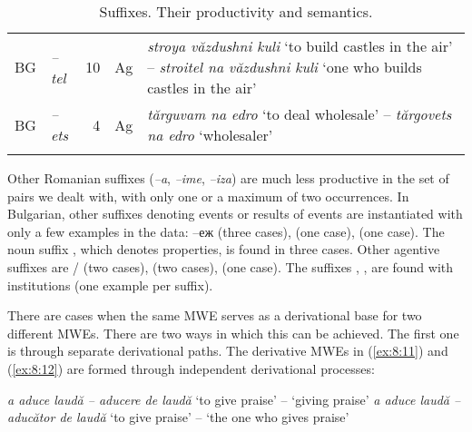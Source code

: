 \documentclass[output=paper]{langsci/langscibook}
\begin{document}
\begin{table}
\begin{tabular}{p{0.4cm} p{1.2cm} r p{1cm} p{6.9cm}}
{ BG} &
{ \textit{–tel}} &
{ 10} &
{ Ag} &
{ \textit{stroya văzdushni kuli} ‘to build
castles in the air’ -- \textit{stroitel na văzdushni kuli} ‘one who builds
castles in the air’}\\

{ BG} &
{ \textit{–ets}} &
{ 4} &
{ Ag} &
{ \textit{tărguvam na edro} ‘to deal
wholesale’ -- \textit{tărgovets na edro} ‘wholesaler’}\\
\lspbottomrule
\end{tabular}
\caption{Suffixes. Their productivity and semantics.}
\label{tab:8:1}
\end{table}


Other Romanian suffixes (\textit{–a}, \textit{–ime}, \textit{–iza}) are much less productive
in the set of pairs we dealt with, with only one or a maximum of two
occurrences. In Bulgarian, other suffixes denoting events or results of
events are instantiated with only a few examples in the data: –еж (three
cases),   (one case),   (one case). The noun suffix , which
denotes properties, is found in three cases. Other agentive suffixes are
/ (two cases),   (two cases),   (one case). The suffixes
, ,  are found with institutions (one example per
suffix).


There are cases when the same MWE serves as a derivational base for two
different MWEs. There are two ways in which this can be achieved. The
first one is through separate derivational paths. The derivative MWEs
in (\ref{ex:8:11}) and (\ref{ex:8:12}) are formed through independent derivational processes:



\begin{exe}
\ex \label{ex:8:11}
\settowidth{}
\begin{xlist}
\ex \label{ex:8:11a}
\textit{a aduce laudă  -- aducere de laudă} 
‘to give praise’ -- ‘giving praise’
\ex \label{ex:8:11b}
\textit{a aduce laudă  -- aducător de laudă}  ‘to give praise’ -- ‘the one
who gives praise’
\end{xlist}
\end{exe}
\end{document}
